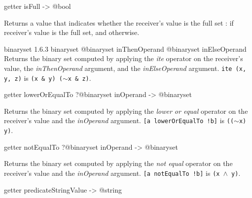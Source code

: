 \begin{galgascode}
getter isFull -> @bool
\end{galgascode}

Returns a  value that indicates whether the receiver's value is the full set :  if receiver's value is the full set, and  otherwise.







{binaryset}
{1.6.3}
{binaryset}
{@binaryset inThenOperand}
{@binaryset inElseOperand}
{Returns the binary set computed by applying the \emph{ite} operator on the receiver's value, the \emph{inThenOperand} argument, and the  \emph{inElseOperand} argument.}
{\texttt{ite (x, y, z)} is \texttt{(x \& y) \textbar ($\sim$x \& z)}.}








\begin{galgascode}
getter lowerOrEqualTo ?@binaryset inOperand -> @binaryset
\end{galgascode}


Returns the binary set computed by applying the \emph{lower or equal} operator on the receiver's value and the \emph{inOperand} argument.
{\texttt{[a lowerOrEqualTo !b]} is \texttt{(($\sim$x) \textbar y)}.}








\begin{galgascode}
getter notEqualTo ?@binaryset inOperand -> @binaryset
\end{galgascode}


Returns the binary set computed by applying the \emph{not equal} operator on the receiver's value and the \emph{inOperand} argument.
{\texttt{[a notEqualTo !b]} is \texttt{(x $\wedge$ y)}.}








\begin{galgascode}
getter predicateStringValue -> @string
\end{galgascode}

